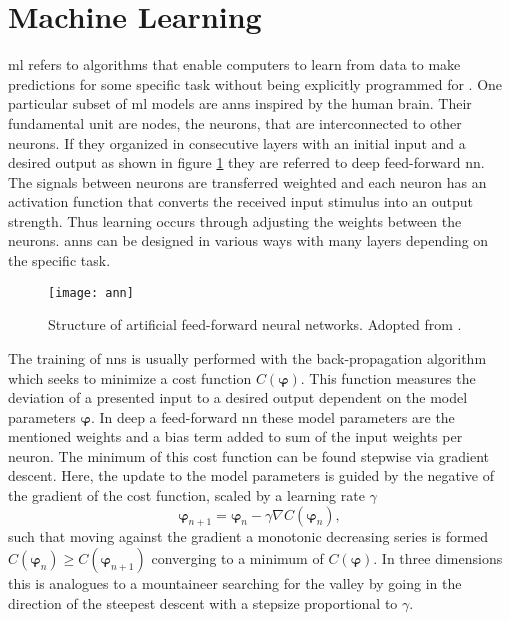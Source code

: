 \section{Machine Learning}
\ac{ml} refers to algorithms that enable computers to learn from data to make predictions for some specific task without being explicitly programmed for \citep{kubat2021introduction}. One particular subset of \ac{ml} models are \acp{ann} inspired by the human brain. Their fundamental unit are nodes, the neurons, that are interconnected to other neurons. If they organized in consecutive layers with an initial input and a desired output as shown in figure \ref{fig:ann} they are referred to deep feed-forward \ac{nn}. The signals between neurons are transferred weighted and each neuron has an activation function that converts the received input stimulus into an output strength. Thus learning occurs through adjusting the weights between the neurons. \acp{ann} can be designed in various ways with many layers depending on the specific task.
\begin{figure}
    \centering
    \texttt{[image: ann]}
    \caption[]{Structure of artificial feed-forward neural networks. Adopted from \citep{8114708}.}
    \label{fig:ann}
\end{figure}

The training of \acp{nn} is usually performed with the back-propagation algorithm which seeks to minimize a cost function $C(\bm{\varphi})$. This function measures the deviation of a presented input to a desired output dependent on the model parameters $\bm{\varphi}$. In deep a feed-forward \ac{nn} these model parameters are the mentioned weights and a bias term added to sum of the input weights per neuron. The minimum of this cost function can be found stepwise via gradient descent. Here, the update to the model parameters is guided by the negative of the gradient of the cost function, scaled by a learning rate $\gamma$
\begin{equation}
    \bm{\varphi}_{n+1} = \bm{\varphi}_n-\gamma\nabla C(\bm{\varphi}_n),
    \label{eq:grad_descent}
\end{equation}
such that moving against the gradient a monotonic decreasing series is formed $C(\bm{\varphi}_n )\ge C(\bm{\varphi}_{n+1})$ converging to a minimum of $C(\bm{\varphi})$. In three dimensions this is analogues to a mountaineer searching for the valley by going in the direction of the steepest descent with a stepsize proportional to $\gamma$.

